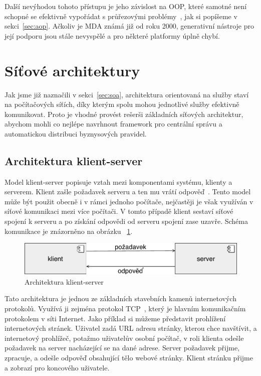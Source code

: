 Další nevýhodou tohoto přístupu je jeho závislost na \gls{OOP},
které samotné není schopné se efektivně vypořádat s průřezovými
problémy~\cite{cemus2014aspect}, jak si popíšeme v sekci~\ref{sec:aop}.
Ačkoliv je \gls{MDA} známá již od roku 2000, generativní nástroje pro
její podporu jsou stále nevyspělé a pro některé platformy úplně chybí.

\section{Síťové architektury}

Jak jsme již naznačili v sekci~\ref{sec:soa}, architektura orientovaná na služby staví
na počítačových síťích, díky kterým spolu mohou jednotlivé služby efektivně komunikovat.
Proto je vhodné provést rešerši základních síťových architektur,
abychom mohli co nejlépe navrhnout framework pro centrální správu
a automatickou distribuci byznysových pravidel.

\subsection{Architektura klient-server}\label{sec:client-server}

Model klient-server popisuje vztah mezi komponentami systému, klienty a serverem.
Klient zašle požadavek serveru a ten mu vrátí odpověď~\cite{berson1992client}.
Tento model může být použit obecně i v rámci jednoho počítače,
nejčastěji je však využíván v síťové komunikaci mezi více počítači.
V tomto případě klient sestaví síťové spojení k serveru a po získání odpovědi
od serveru spojení zase uzavře. Schéma komunikace je znázorněno
na obrázku ~\ref{fig:client-server}.

\begin{figure}[t]
    \centering
    \includegraphics[keepaspectratio=true, width=0.6\linewidth]{figures/client-server.pdf}
    \caption{Architektura klient-server}
    \label{fig:client-server}
\end{figure}

Tato architektura je jednou ze základních stavebních kamenů
internetových protokolů. Využívá ji zejména protokol
\gls{TCP}~\cite{postel1981transmission}, který je hlavním
komunikačním protokolem v síti Internet. Jako příklad si můžeme představit
prohlížení internetových stránek. Uživatel zadá \gls{URL} adresu
stránky, kterou chce navštívit, a internetový prohlížeč, potažmo uživatelův osobní počítač,
v roli klienta odešle požadavek na server nacházející se na dané adrese.
Server požadavek přijme, zpracuje, a odešle odpověď obsahující
tělo webové stránky. Klient stránku přijme a zobrazí pro koncového
uživatele.

